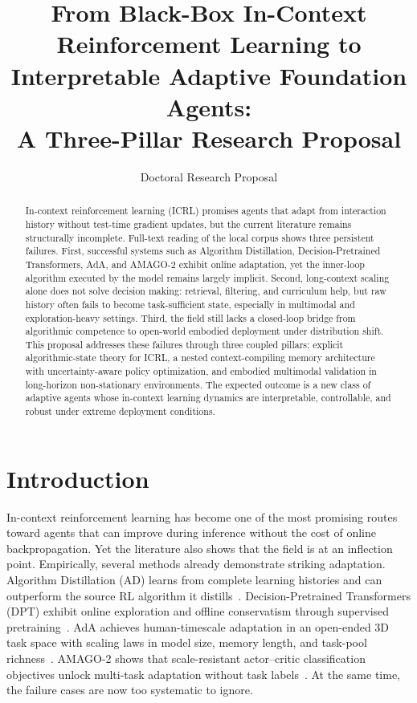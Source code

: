 \documentclass[10pt,twocolumn,letterpaper]{article}
\title{\textbf{From Black-Box In-Context Reinforcement Learning to\\
Interpretable Adaptive Foundation Agents:\\
A Three-Pillar Research Proposal}}
\author{Doctoral Research Proposal}
\date{}
\begin{document}
\maketitle

\begin{abstract}
In-context reinforcement learning (ICRL) promises agents that adapt from interaction history without test-time gradient updates, but the current literature remains structurally incomplete. Full-text reading of the local corpus shows three persistent failures. First, successful systems such as Algorithm Distillation, Decision-Pretrained Transformers, AdA, and AMAGO-2 exhibit online adaptation, yet the inner-loop algorithm executed by the model remains largely implicit. Second, long-context scaling alone does not solve decision making: retrieval, filtering, and curriculum help, but raw history often fails to become task-sufficient state, especially in multimodal and exploration-heavy settings. Third, the field still lacks a closed-loop bridge from algorithmic competence to open-world embodied deployment under distribution shift. This proposal addresses these failures through three coupled pillars: explicit algorithmic-state theory for ICRL, a nested context-compiling memory architecture with uncertainty-aware policy optimization, and embodied multimodal validation in long-horizon non-stationary environments. The expected outcome is a new class of adaptive agents whose in-context learning dynamics are interpretable, controllable, and robust under extreme deployment conditions.
\end{abstract}

\section{Introduction}
In-context reinforcement learning has become one of the most promising routes toward agents that can improve during inference without the cost of online backpropagation. Yet the literature also shows that the field is at an inflection point. Empirically, several methods already demonstrate striking adaptation. Algorithm Distillation (AD) learns from complete learning histories and can outperform the source RL algorithm it distills~\cite{laskin2022ad}. Decision-Pretrained Transformers (DPT) exhibit online exploration and offline conservatism through supervised pretraining~\cite{lee2023dpt}. AdA achieves human-timescale adaptation in an open-ended 3D task space with scaling laws in model size, memory length, and task-pool richness~\cite{adaptive2023ada}. AMAGO-2 shows that scale-resistant actor--critic classification objectives unlock multi-task adaptation without task labels~\cite{grigsby2024amago2}. At the same time, the failure cases are now too systematic to ignore.
\end{document}
